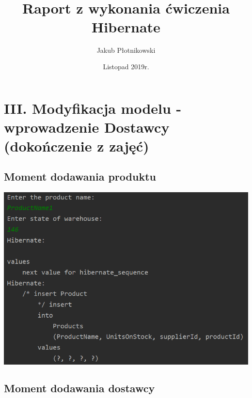 \documentclass[a4paper, 11pt]{article}
\title{Raport z wykonania ćwiczenia Hibernate}
\author{Jakub Płotnikowski}
\date{Listopad 2019r.}
\begin{document}
    \maketitle
    \tableofcontents

    \newpage

    \section{III. Modyfikacja modelu - wprowadzenie Dostawcy (dokończenie z zajęć)}

    \subsection{Moment dodawania produktu}

    \begin{center}
        \includegraphics{images/point3/addProduct.png}
    \end{center}

    \subsection{Moment dodawania dostawcy}
\end{document}

